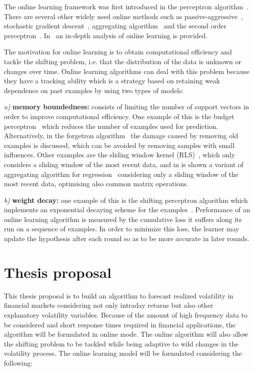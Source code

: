 The online learning framework was first introduced in the perceptron algorithm~\cite{rosenblatt58}. There are several other widely used online methods such as passive-aggressive~\cite{crammerETall2006}, stochastic gradient descent~\cite{zhang2004}, aggregating algorithm~\cite{vovk2001} and the second order perceptron~\cite{cesa-bianchi2005}.  In~\cite{cesa-bianchi2006} an in-depth analysis of online learning is provided.

The motivation for online learning is to obtain computational efficiency and tackle the shifting problem, i.e. that the distribution of the data is unknown or changes over time. Online learning algorithms can deal with this problem because they have a tracking ability which is a strategy based on retaining weak dependence on past examples by using two types of models: 

\textit{a)} \textbf{memory boundedness:} consists of limiting the number of support vectors in order to improve computational efficiency. One example of this is the budget perceptron~\cite{crammeretal2004} which reduces the number of examples used for prediction. Alternatively, in the forgetron algorithm~\cite{dekeletal2008} the damage caused by removing old examples is discussed, which can be avoided by removing samples with small influences. Other examples are the sliding window kernel (RLS)~\cite{vanvaerenberghetal2006}, which only considers a sliding window of the most recent data, and in \cite{arce+salinas2012} is shown a variant of aggregating algorithm for regression~\cite{vovk2001} considering only a sliding window of the most recent data, optimising also common matrix operations.

\textit{b)} \textbf{weight decay:} one example of this is the shifting perceptron algorithm which implements an exponential decaying scheme for the examples~\cite{cavallantietal2007}.
Performance of an online learning algorithm is measured by the cumulative loss it suffers along its run on a sequence of examples. In order to minimize this loss, the learner may update the hypothesis after each round so as to be more accurate in later rounds.

\section{Thesis proposal}

This thesis proposal is to build an algorithm to forecast realized volatility in financial markets considering not only intraday returns but also other explanatory volatility variables. Because of the amount of high frequency data to be considered and short response times required in financial applications, the algorithm will be formulated in online mode. The online algorithm will also allow the shifting problem to be tackled while being adaptive to wild changes in the volatility process.
The online learning model will be formulated considering the following:

